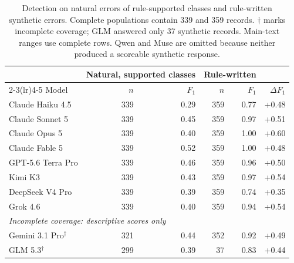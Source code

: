 \begin{table}[t]\centering\small
\begin{tabular}{lrrrrr}
\toprule
 & \multicolumn{2}{c}{Natural, supported classes} & \multicolumn{2}{c}{Rule-written} & \\
\cmidrule(lr){2-3}\cmidrule(lr){4-5}
Model & $n$ & $F_1$ & $n$ & $F_1$ & $\Delta F_1$ \\
\midrule
Claude Haiku 4.5 & 339 & 0.29 & 359 & 0.77 & +0.48 \\
Claude Sonnet 5 & 339 & 0.45 & 359 & 0.97 & +0.51 \\
Claude Opus 5 & 339 & 0.40 & 359 & 1.00 & +0.60 \\
Claude Fable 5 & 339 & 0.52 & 359 & 1.00 & +0.48 \\
GPT-5.6 Terra Pro & 339 & 0.46 & 359 & 0.96 & +0.50 \\
Kimi K3 & 339 & 0.43 & 359 & 0.97 & +0.54 \\
DeepSeek V4 Pro & 339 & 0.39 & 359 & 0.74 & +0.35 \\
Grok 4.6 & 339 & 0.40 & 359 & 0.94 & +0.54 \\
\midrule
\multicolumn{6}{l}{\emph{Incomplete coverage: descriptive scores only}} \\
Gemini 3.1 Pro$^{\dagger}$ & 321 & 0.44 & 352 & 0.92 & +0.49 \\
GLM 5.3$^{\dagger}$ & 299 & 0.39 & 37 & 0.83 & +0.44 \\
\bottomrule
\end{tabular}
\caption{Detection on natural errors of rule-supported classes and rule-written
synthetic errors. Complete populations contain 339 and 359 records.
$\dagger$ marks incomplete coverage; GLM answered only 37 synthetic records.
Main-text ranges use complete rows. Qwen and Muse are omitted because neither
produced a scoreable synthetic response.}
\label{tab:synthetic}
\end{table}
